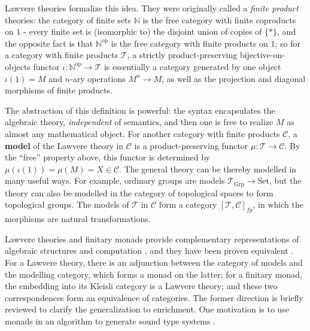\documentclass[a4paper,UKenglish]{article}
\newcommand{\Set}{\mathrm{Set}}
\newcommand{\Grp}{\mathrm{Grp}}
\newcommand{\op}{\mathrm{op}}
\newcommand{\NN}{\mathbb{N}}
\newcommand{\C}{\mathscr{C}}
\newcommand{\T}{\mathscr{T}}
\begin{document}
Lawvere theories formalize this idea. They were originally called a \textit{finite product} theories: the category of finite sets $\NN$ is the free category with finite coproducts on $1$ - every finite set is (isomorphic to) the disjoint union of copies of $\{*\}$, and the opposite fact is that $\NN^\op$ is the free category with finite products on $1$; so for a category with finite products $\T$, a strictly product-preserving bijective-on-objects functor $\iota:\NN^\op \to \T$ is essentially a category generated by one object $\iota(1) = M$ and $n$-ary operations $M^n \to M$, as well as the projection and diagonal morphisms of finite products.

The abstraction of this definition is powerful: the syntax encapsulates the algebraic theory, \textit{independent} of semantics, and then one is free to realize $M$ as almost any mathematical object. For another category with finite products $\C$, a \textbf{model} of the Lawvere theory in $\C$ is a product-preserving functor $\mu: \T \to \C$. By the ``free'' property above, this functor is determined by $\mu(\iota(1)) = \mu(M) = X \in \C$. The general theory can be thereby modelled in many useful ways. For example, ordinary groups are models $\T_\Grp \to \Set$, but the theory can also be modelled in the category of topological spaces to form topological groups. The models of $\T$ in $\C$ form a category $[\T,\C]_{fp}$, in which the morphisms are natural transformations. 

Lawvere theories and finitary monads provide complementary representations of algebraic structures and computation \cite{ltam}, and they have been proven equivalent \cite{linton}. For a Lawvere theory, there is an adjunction between the category of models and the modelling category, which forms a monad on the latter; for a finitary monad, the embedding into its Kleisli category is a Lawvere theory; and these two correspondences form an equivalence of categories. The former direction is briefly reviewed to clarify the generalization to enrichment. One motivation is to use monads in an algorithm to generate sound type systems \cite{ladl}.
\end{document}
